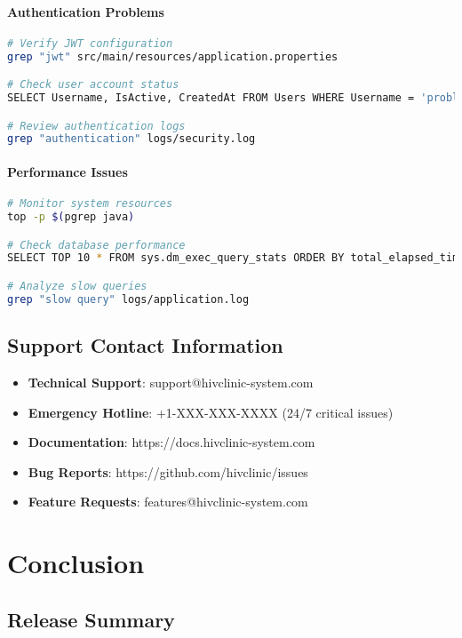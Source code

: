 \documentclass[12pt,a4paper]{article}
\begin{document}
\paragraph{Authentication Problems}
\begin{lstlisting}[language=bash]
# Verify JWT configuration
grep "jwt" src/main/resources/application.properties

# Check user account status
SELECT Username, IsActive, CreatedAt FROM Users WHERE Username = 'problematic_user';

# Review authentication logs
grep "authentication" logs/security.log
\end{lstlisting}

\paragraph{Performance Issues}
\begin{lstlisting}[language=bash]
# Monitor system resources
top -p $(pgrep java)

# Check database performance
SELECT TOP 10 * FROM sys.dm_exec_query_stats ORDER BY total_elapsed_time DESC;

# Analyze slow queries
grep "slow query" logs/application.log
\end{lstlisting}

\subsection{Support Contact Information}

\begin{itemize}
    \item \textbf{Technical Support}: support@hivclinic-system.com
    \item \textbf{Emergency Hotline}: +1-XXX-XXX-XXXX (24/7 critical issues)
    \item \textbf{Documentation}: https://docs.hivclinic-system.com
    \item \textbf{Bug Reports}: https://github.com/hivclinic/issues
    \item \textbf{Feature Requests}: features@hivclinic-system.com
\end{itemize}

\section{Conclusion}

\subsection{Release Summary}
\end{document}
